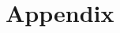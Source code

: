 \documentclass[10pt,a4paper,pointlessnumbers,bibtotocnumbered,headsepline]{scrbook}
\begin{document}

\appendix
\part{Appendix}


\begin{thebibliography}{99}
%
%
%
\end{thebibliography}
%
%


\printindex
\end{document}

